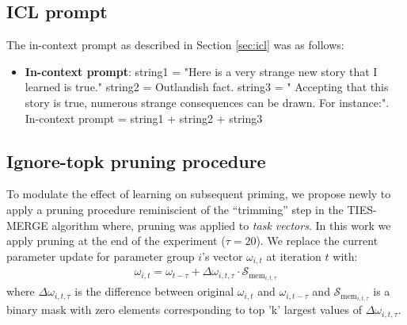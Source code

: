 \documentclass[11pt, a4paper, logo, copyright]{googledeepmind}
\theoremstyle{plain}
\theoremstyle{definition}
\theoremstyle{remark}
\begin{document}
\subsection{ICL prompt}
\label{sec:icl_methods}

The in-context prompt as described in Section \ref{sec:icl} was as follows:

\noindent\makebox[\textwidth]{\rule{\textwidth}{0.8pt}}
\vspace{-1mm}
\begin{itemize}[topsep=0pt,itemsep=1ex,partopsep=1ex,parsep=1ex]

\item \textbf{In-context prompt}: string1 = "Here is a very strange new story that I learned is true." string2 = Outlandish fact. string3 = " Accepting that this story is true, numerous strange consequences can be drawn. For instance:". In-context prompt = string1 + string2 + string3

\end{itemize}
\vspace{-1mm}
\noindent\makebox[\textwidth]{\rule{\textwidth}{0.8pt}}
\vspace{4mm}


\subsection{Ignore-topk pruning procedure}
\label{sec:sparsify_methods}
To modulate the effect of learning on subsequent priming, we propose newly to apply a pruning procedure reminiscient of the ``trimming'' step in the TIES-MERGE algorithm \citep{ties_merge} where, pruning was applied to {\em task vectors}. In this work we apply pruning at the end of the experiment ($\tau = 20$). We replace the current parameter update for parameter group $i$'s vector $\omega_{i,t}$ at iteration $t$ with:
\begin{align}
\label{eqn:sparse1}    
        \omega_{i,t} =
            \omega_{t-\tau} + \Delta  \omega_{i,t,\tau} \cdot \mathcal{S}_{\text{mem}_{i,t, \tau}}
\end{align}
where $\Delta \omega_{i,t, \tau}$ is the difference between original $\omega_{i,t}$ and  $\omega_{i, t-\tau}$ and  $\mathcal{S}_{\text{mem}_{i,t, \tau}}$ is a binary mask with zero elements corresponding to top 'k' largest values of $\Delta \omega_{i,t, \tau}$. 
\end{document}
